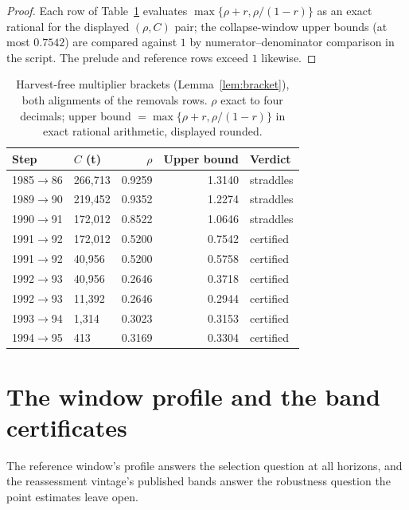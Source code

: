 \documentclass[10pt,twocolumn]{article}
\theoremstyle{plain}
\theoremstyle{remark}
\begin{document}
\begin{proof}
Each row of Table~\ref{tab:brackets} evaluates
\(\max\{\rho + r, \rho/(1-r)\}\) as an exact rational for the displayed
\((\rho, C)\) pair; the collapse-window upper bounds (at most
\(0.7542\)) are compared against \(1\) by
numerator--denominator comparison in the script. The prelude and
reference rows exceed \(1\) likewise.
\end{proof}

\begin{table}[t]
\centering
\scriptsize
\setlength{\tabcolsep}{3.2pt}
\caption{Harvest-free multiplier brackets (Lemma~\ref{lem:bracket}),
both alignments of the removals rows. \(\rho\) exact to four decimals;
upper bound \(=\max\{\rho+r, \rho/(1-r)\}\) in exact rational
arithmetic, displayed rounded.}
\label{tab:brackets}
\begin{tabular}{@{}l l r r l@{}}
\toprule
Step & \(C\) (t) & \(\rho\) & Upper bound & Verdict \\
\midrule
1985$\to$86 & 266{,}713 & 0.9259 & 1.3140 & straddles \\
1989$\to$90 & 219{,}452 & 0.9352 & 1.2274 & straddles \\
1990$\to$91 & 172{,}012 & 0.8522 & 1.0646 & straddles \\
1991$\to$92 & 172{,}012 & 0.5200 & 0.7542 & certified \\
1991$\to$92 & 40{,}956 & 0.5200 & 0.5758 & certified \\
1992$\to$93 & 40{,}956 & 0.2646 & 0.3718 & certified \\
1992$\to$93 & 11{,}392 & 0.2646 & 0.2944 & certified \\
1993$\to$94 & 1{,}314 & 0.3023 & 0.3153 & certified \\
1994$\to$95 & 413 & 0.3169 & 0.3304 & certified \\
\bottomrule
\end{tabular}
\end{table}

\section{The window profile and the band certificates}\label{profile}

The reference window's profile answers the selection question at all
horizons, and the reassessment vintage's published bands answer the
robustness question the point estimates leave open.
\end{document}
